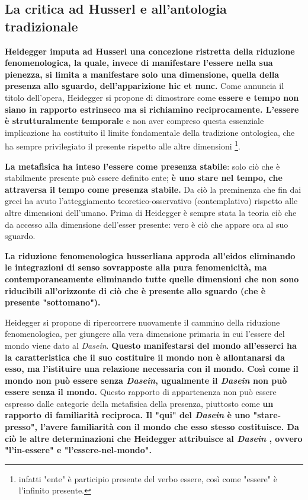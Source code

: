 \subsection{La critica ad Husserl e all'antologia tradizionale}

\textbf{Heidegger imputa ad Husserl una concezione
ristretta della riduzione fenomenologica, la quale,
invece di manifestare l'essere nella sua pienezza,
si limita a manifestare solo una dimensione,
quella della presenza allo sguardo, dell'apparizione hic et nunc.}
Come annuncia il titolo dell'opera, Heidegger
si propone di dimostrare come \textbf{essere e tempo
non siano in rapporto estrinseco ma si richiamino
reciprocamente. L'essere è strutturalmente
temporale }e non aver compreso questa essenziale
implicazione ha costituito il limite fondamentale
della tradizione ontologica, che ha sempre
privilegiato il presente rispetto alle altre dimensioni
\footnote{infatti "ente" è participio presente del verbo essere, così
	come "essere" è l'infinito presente.}.

\textbf{La metafisica ha inteso l'essere come presenza
stabile}: solo ciò che è stabilmente presente può
essere definito ente; \textbf{è uno stare nel tempo, che
attraversa il tempo come presenza stabile.}
Da ciò la preminenza che fin dai greci ha avuto
l'atteggiamento teoretico-osservativo (contemplativo) rispetto alle
altre dimensioni dell'umano. Prima di Heidegger è sempre stata la teoria ciò che
da accesso alla dimensione dell'esser presente: vero è
ciò che appare ora al suo sguardo.


\textbf{La riduzione fenomenologica husserliana approda
all'eidos eliminando le integrazioni di senso
sovrapposte alla pura fenomenicità, ma contemporaneamente eliminando tutte quelle dimensioni che non
sono riducibili all'orizzonte di ciò che è presente
allo sguardo (che è presente "sottomano").}

Heidegger si propone di ripercorrere nuovamente
il cammino della riduzione fenomenologica,
per giungere alla vera dimensione primaria in cui
l'essere del mondo viene dato al \textit{Dasein}.
\textbf{Questo manifestarsi del mondo all'esserci ha
la caratteristica che
il suo costituire il mondo non è allontanarsi
da esso, ma l'istituire una relazione necessaria
con il mondo. Così come il mondo non può essere
senza \textit{Dasein}, ugualmente il \textit{Dasein} non può essere
senza il mondo.} Questo rapporto di appartenenza
non può essere espresso dalle categorie della metafisica
della presenza, piuttosto come \textbf{un rapporto di familiarità
reciproca. Il "qui" del \textit{Dasein} è uno "stare-presso",
l'avere familiarità con il mondo che esso stesso
costituisce.
Da ciò le altre determinazioni che Heidegger
attribuisce al \textit{Dasein} , ovvero "l'in-essere" e
"l'essere-nel-mondo".}

